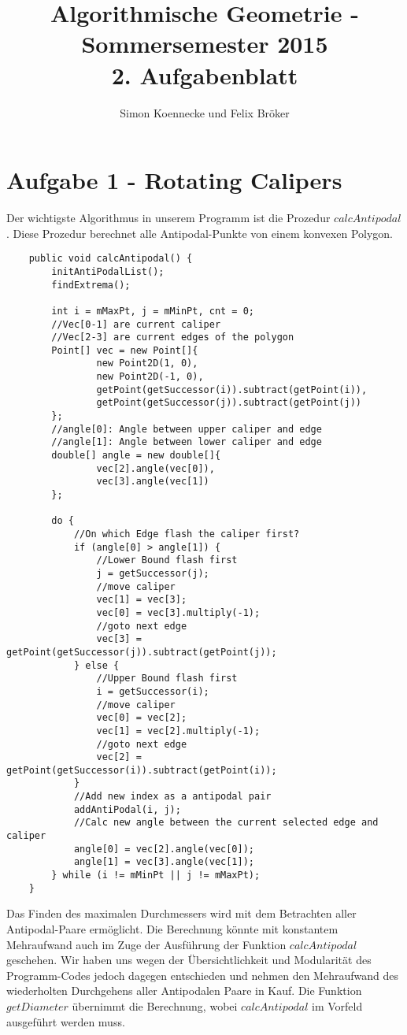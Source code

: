 \documentclass[a4paper]{article}
\begin{document}
\title{Algorithmische Geometrie - Sommersemester 2015\\
       2. Aufgabenblatt }
\author{Simon Koennecke und Felix Bröker}
\date{}
\maketitle

\section*{Aufgabe 1 - Rotating Calipers}

Der wichtigste Algorithmus in unserem Programm ist die Prozedur $calcAntipodal$. Diese Prozedur berechnet alle Antipodal-Punkte von einem konvexen Polygon.
\vspace*{0.5cm}
\begin{lstlisting}
    public void calcAntipodal() {
        initAntiPodalList();
        findExtrema();

        int i = mMaxPt, j = mMinPt, cnt = 0;
        //Vec[0-1] are current caliper
        //Vec[2-3] are current edges of the polygon
        Point[] vec = new Point[]{
                new Point2D(1, 0),
                new Point2D(-1, 0),
                getPoint(getSuccessor(i)).subtract(getPoint(i)),
                getPoint(getSuccessor(j)).subtract(getPoint(j))
        };
        //angle[0]: Angle between upper caliper and edge
		//angle[1]: Angle between lower caliper and edge
        double[] angle = new double[]{
                vec[2].angle(vec[0]),
                vec[3].angle(vec[1])
        };

        do {
            //On which Edge flash the caliper first?
            if (angle[0] > angle[1]) {
                //Lower Bound flash first
                j = getSuccessor(j);
                //move caliper
                vec[1] = vec[3];
                vec[0] = vec[3].multiply(-1);
                //goto next edge
                vec[3] = getPoint(getSuccessor(j)).subtract(getPoint(j));
            } else {
                //Upper Bound flash first
                i = getSuccessor(i);
                //move caliper
                vec[0] = vec[2];
                vec[1] = vec[2].multiply(-1);
                //goto next edge
                vec[2] = getPoint(getSuccessor(i)).subtract(getPoint(i));
            }
            //Add new index as a antipodal pair
            addAntiPodal(i, j);
			//Calc new angle between the current selected edge and caliper
            angle[0] = vec[2].angle(vec[0]);
            angle[1] = vec[3].angle(vec[1]);
        } while (i != mMinPt || j != mMaxPt);
    }

\end{lstlisting}
Das Finden des maximalen Durchmessers wird mit dem Betrachten aller Antipodal-Paare ermöglicht. Die Berechnung könnte mit konstantem Mehraufwand auch im Zuge der Ausführung der Funktion $calcAntipodal$ geschehen. Wir haben uns wegen der Übersichtlichkeit und Modularität des Programm-Codes jedoch dagegen entschieden und nehmen den Mehraufwand des wiederholten Durchgehens aller Antipodalen Paare in Kauf. Die Funktion $getDiameter$ übernimmt die Berechnung, wobei $calcAntipodal$ im Vorfeld ausgeführt werden muss.
\end{document}
